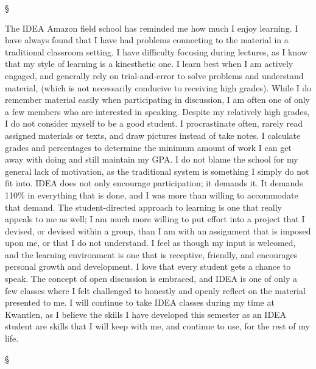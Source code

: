 \documentclass[letterpaper,10pt,headsepline]{scrreprt}
\begin{document}
\begin{center}§\end{center}

The IDEA Amazon field school has reminded me how much I enjoy learning.
I have always found that I have had problems connecting to the material
in a traditional classroom setting. I have difficulty focusing during
lectures, as I know that my style of learning is a kinesthetic one. I
learn best when I am actively engaged, and generally rely on
trial-and-error to solve problems and understand material, (which is not
necessarily conducive to receiving high grades). While I do remember
material easily when participating in discussion, I am often one of only
a few members who are interested in speaking. Despite my relatively high
grades, I do not consider myself to be a good student. I procrastinate
often, rarely read assigned materials or texts, and draw pictures
instead of take notes. I calculate grades and percentages to determine
the minimum amount of work I can get away with doing and still maintain
my GPA. I do not blame the school for my general lack of motivation, as
the traditional system is something I simply do not fit into. IDEA does
not only encourage participation; it demands it. It demands 110\% in
everything that is done, and I was more than willing to accommodate that
demand. The student-directed approach to learning is one that really
appeals to me as well; I am much more willing to put effort into a
project that I devised, or devised within a group, than I am with an
assignment that is imposed upon me, or that I do not understand. I feel
as though my input is welcomed, and the learning environment is one that
is receptive, friendly, and encourages personal growth and development.
I love that every student gets a chance to speak. The concept of open
discussion is embraced, and IDEA is one of only a few classes where I
felt challenged to honestly and openly reflect on the material presented
to me. I will continue to take IDEA classes during my time at Kwantlen,
as I believe the skills I have developed this semester as an IDEA
student are skills that I will keep with me, and continue to use, for
the rest of my life.

\begin{center}§\end{center}
\end{document}
